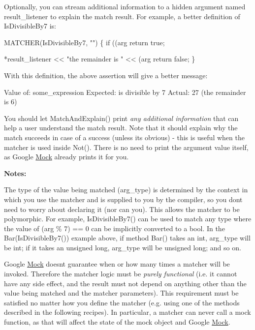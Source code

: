 Optionally, you can stream additional information to a hidden argument named {\ttfamily result\+\_\+listener} to explain the match result. For example, a better definition of {\ttfamily Is\+Divisible\+By7} is\+: 
\begin{DoxyCode}
MATCHER(IsDivisibleBy7, "") \{
  if ((arg %
    return true;

  *result\_listener << "the remainder is " << (arg %
  return false;
\}
\end{DoxyCode}


With this definition, the above assertion will give a better message\+: 
\begin{DoxyCode}
Value of: some\_expression
Expected: is divisible by 7
  Actual: 27 (the remainder is 6)
\end{DoxyCode}


You should let {\ttfamily Match\+And\+Explain()} print {\itshape any additional information} that can help a user understand the match result. Note that it should explain why the match succeeds in case of a success (unless it\textquotesingle{}s obvious) -\/ this is useful when the matcher is used inside {\ttfamily Not()}. There is no need to print the argument value itself, as Google \hyperlink{class_mock}{Mock} already prints it for you.

{\bfseries Notes\+:}


\begin{DoxyEnumerate}
\item The type of the value being matched ({\ttfamily arg\+\_\+type}) is determined by the context in which you use the matcher and is supplied to you by the compiler, so you don\textquotesingle{}t need to worry about declaring it (nor can you). This allows the matcher to be polymorphic. For example, {\ttfamily Is\+Divisible\+By7()} can be used to match any type where the value of {\ttfamily (arg \% 7) == 0} can be implicitly converted to a {\ttfamily bool}. In the {\ttfamily Bar(\+Is\+Divisible\+By7())} example above, if method {\ttfamily Bar()} takes an {\ttfamily int}, {\ttfamily arg\+\_\+type} will be {\ttfamily int}; if it takes an {\ttfamily unsigned long}, {\ttfamily arg\+\_\+type} will be {\ttfamily unsigned long}; and so on.
\end{DoxyEnumerate}
\begin{DoxyEnumerate}
\item Google \hyperlink{class_mock}{Mock} doesn\textquotesingle{}t guarantee when or how many times a matcher will be invoked. Therefore the matcher logic must be {\itshape purely functional} (i.\+e. it cannot have any side effect, and the result must not depend on anything other than the value being matched and the matcher parameters). This requirement must be satisfied no matter how you define the matcher (e.\+g. using one of the methods described in the following recipes). In particular, a matcher can never call a mock function, as that will affect the state of the mock object and Google \hyperlink{class_mock}{Mock}.
\end{DoxyEnumerate}

